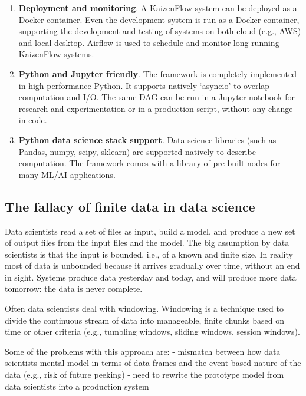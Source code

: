 \documentclass[11pt, reqno]{amsart}
\theoremstyle{definition}
\theoremstyle{remark}
\begin{document}
\begin{enumerate}
    \item \textbf{Deployment and monitoring}. A KaizenFlow system can be deployed
      as a Docker container. Even the development system is run as a Docker
      container, supporting the development and testing of systems on both cloud
      (e.g., AWS) and local desktop. Airflow is used to schedule and monitor
      long-running KaizenFlow systems.

    \item \textbf{Python and Jupyter friendly}. The framework is completely implemented
      in high-performance Python. It supports natively `asyncio' to overlap
      computation and I/O. The same DAG can be run in a Jupyter notebook for research
      and experimentation or in a production script, without any change in code.

    \item \textbf{Python data science stack support}. Data science libraries (such
      as Pandas, numpy, scipy, sklearn) are supported natively to describe
      computation. The framework comes with a library of pre-built nodes for many
      ML/AI applications.
  \end{enumerate}

  \subsection{The fallacy of finite data in data science}

  Data scientists read a set of files as input, build a model, and produce a new
  set of output files from the input files and the model. The big assumption by data
  scientists is that the input is bounded, i.e., of a known and finite size. In reality
  most of data is unbounded because it arrives gradually over time, without an
  end in sight. Systems produce data yesterday and today, and will produce more
  data tomorrow: the data is never complete.

  Often data scientists deal with windowing. Windowing is a technique used to
  divide the continuous stream of data into manageable, finite chunks based on time
  or other criteria (e.g., tumbling windows, sliding windows, session windows).

  Some of the problems with this approach are: - mismatch between how data
  scientists mental model in terms of data frames and the event based nature of
  the data (e.g., risk of future peeking) - need to rewrite the prototype model
  from data scientists into a production system
\end{document}
